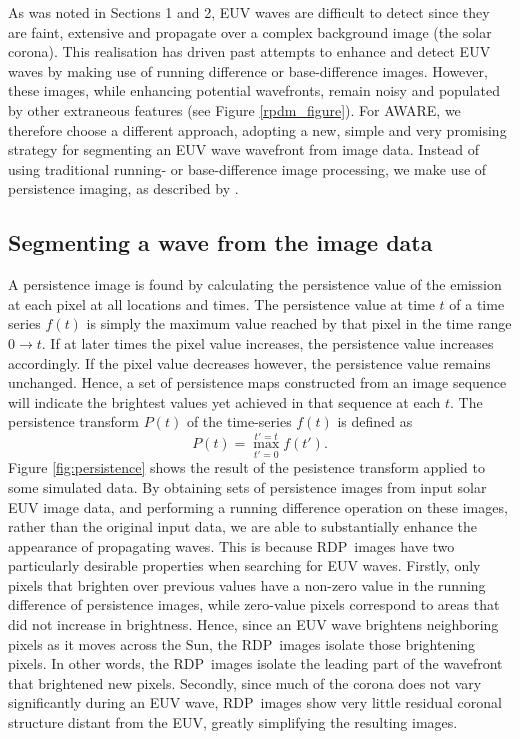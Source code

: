 \documentclass[referee,a4paper,12pt,traditabstract]{swsc}
\newcommand{\RDP}{RDP}
\begin{document}
\begin{linenumbers}
As was noted in Sections 1 and 2, EUV waves are difficult to detect
since they are faint, extensive and propagate over a complex
background image (the solar corona). This realisation has driven past
attempts to enhance and detect EUV waves by making use of running
difference or base-difference images. However, these images, while
enhancing potential wavefronts, remain noisy and populated by other
extraneous features (see Figure \ref{rpdm_figure}). For AWARE, we
therefore choose a different approach, adopting a new, simple and very
promising strategy for segmenting an EUV wave wavefront from image
data. Instead of using traditional running- or base-difference image
processing, we make use of persistence imaging, as described by
\citet{2014AAS...22421838T}.

\subsection{Segmenting a wave from the image data}\label{sec:aware:segment}

A persistence image is found by calculating the persistence value of
the emission at each pixel at all locations and times.  The
persistence value at time $t$ of a time series $f(t)$ is simply the
maximum value reached by that pixel in the time range $0\rightarrow
t$.  If at later times the pixel value increases, the persistence
value increases accordingly. If the pixel value decreases however, the
persistence value remains unchanged. Hence, a set of persistence maps
constructed from an image sequence will indicate the brightest values
yet achieved in that sequence at each $t$.  The persistence transform
$P(t)$ of the time-series $f(t)$ is defined as
\begin{equation}
\label{eqn:persisttransform}
P(t) = \max_{t'=0}^{t'=t}f(t').
\end{equation}
Figure \ref{fig:persistence} shows the result of the pesistence
transform applied to some simulated data.  By obtaining sets of
persistence images from input solar EUV image data, and performing a
running difference operation on these images, rather than the original
input data, we are able to substantially enhance the appearance of
propagating waves. This is because \RDP\ images have two particularly
desirable properties when searching for EUV waves.  Firstly, only
pixels that brighten over previous values have a non-zero value in the
running difference of persistence images, while zero-value pixels
correspond to areas that did not increase in brightness. Hence, since
an EUV wave brightens neighboring pixels as it moves across the Sun,
the \RDP\ images isolate those brightening pixels.  In other words,
the \RDP\ images isolate the leading part of the wavefront that
brightened new pixels.  Secondly, since much of the corona does not
vary significantly during an EUV wave, \RDP\ images show very little
residual coronal structure distant from the EUV, greatly simplifying
the resulting images.


\end{linenumbers}
\end{document}
